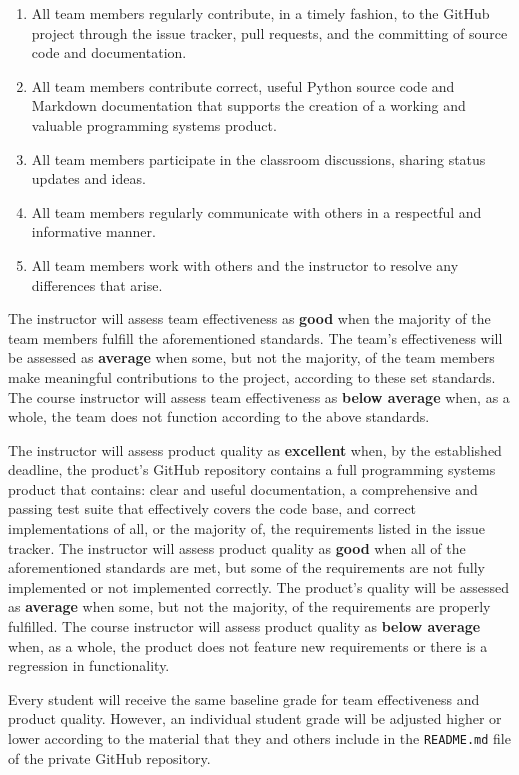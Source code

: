\documentclass[11pt]{article}
\newcommand{\reflection}{\lstinline{README.md}}
\begin{document}
\begin{enumerate}
  \setlength{\itemsep}{0pt}

  \item All team members regularly contribute, in a timely fashion, to the GitHub project through the issue tracker,
    pull requests, and the committing of source code and documentation.

  \item All team members contribute correct, useful Python source code and Markdown documentation that supports the
    creation of a working and valuable programming systems product.

  \item All team members participate in the classroom discussions, sharing status updates and ideas.

  \item All team members regularly communicate with others in a respectful and informative manner.

  \item All team members work with others and the instructor to resolve any differences that arise.

\end{enumerate}

\vspace*{-.5em}

The instructor will assess team effectiveness as {\bf good} when the majority of the team members fulfill the
aforementioned standards. The team's effectiveness will be assessed as {\bf average} when some, but not the majority, of
the team members make meaningful contributions to the project, according to these set standards. The course instructor
will assess team effectiveness as {\bf below average} when, as a whole, the team does not function according to the
above standards.

The instructor will assess product quality as {\bf excellent} when, by the established deadline, the product's GitHub
repository contains a full programming systems product that contains: clear and useful documentation, a comprehensive
and passing test suite that effectively covers the code base, and correct implementations of all, or the majority of,
the requirements listed in the issue tracker. The instructor will assess product quality as {\bf good} when all of the
aforementioned standards are met, but some of the requirements are not fully implemented or not implemented correctly.
The product's quality will be assessed as {\bf average} when some, but not the majority, of the requirements are
properly fulfilled. The course instructor will assess product quality as {\bf below average} when, as a whole, the
product does not feature new requirements or there is a regression in functionality.

Every student will receive the same baseline grade for team effectiveness and product quality. However, an individual
student grade will be adjusted higher or lower according to the material that they and others include in the
\reflection{} file of the private GitHub repository.
\end{document}
